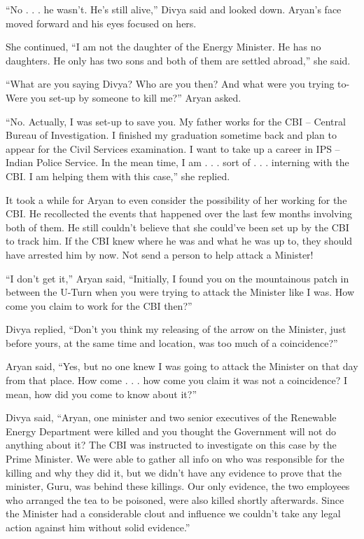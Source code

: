 “No . . . he wasn't. He's still alive,” Divya said and looked down. Aryan's face
moved forward and his eyes focused on hers.

She continued, “I am not the daughter of the Energy Minister. He has no
daughters. He only has two sons and both of them are settled abroad,” she said.

“What are you saying Divya? Who are you then? And what were you trying to- Were
you set-up by someone to kill me?” Aryan asked.

“No. Actually, I was set-up to save you. My father works for the CBI – Central
Bureau of Investigation. I finished my graduation sometime back and plan to
appear for the Civil Services examination. I want to take up a career in IPS –
Indian Police Service. In the mean time, I am . . . sort of . . . interning with
the CBI. I am helping them with this case,” she replied.

It took a while for Aryan to even consider the possibility of her working for
the CBI. He recollected the events that happened over the last few months
involving both of them. He still couldn't believe that she could've been set up
by the CBI to track him. If the CBI knew where he was and what he was up to,
they should have arrested him by now. Not send a person to help attack a
Minister!

“I don't get it,” Aryan said, “Initially, I found you on the mountainous patch
in between the U-Turn when you were trying to attack the Minister like I was.
How come you claim to work for the CBI then?”

Divya replied, “Don't you think my releasing of the arrow on the Minister, just
before yours, at the same time and location, was too much of a coincidence?”

Aryan said, “Yes, but no one knew I was going to attack the Minister on that day
from that place. How come . . . how come you claim it was not a coincidence? I
mean, how did you come to know about it?”

Divya said, “Aryan, one minister and two senior executives of the Renewable
Energy Department were killed and you thought the Government will not do
anything about it? The CBI was instructed to investigate on this case by the
Prime Minister. We were able to gather all info on who was responsible for the
killing and why they did it, but we didn't have any evidence to prove that the
minister, Guru, was behind these killings. Our only evidence, the two employees
who arranged the tea to be poisoned, were also killed shortly afterwards. Since
the Minister had a considerable clout and influence we couldn't take any legal
action against him without solid evidence.”


